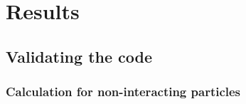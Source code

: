 \chapter{Results}


\section{Validating the code}


\subsection{Calculation for non-interacting particles}

\cite{inf3331}